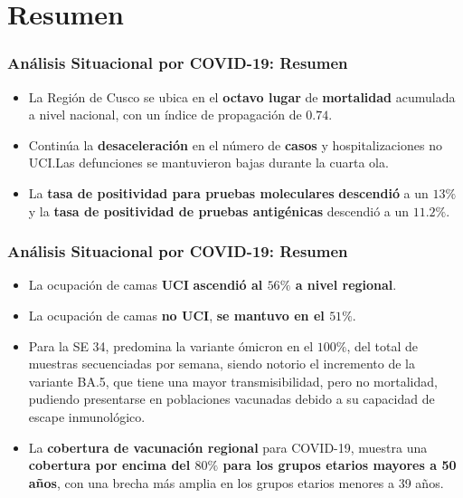 \documentclass[xcolor=table]{beamer}
\begin{document}
\section{Resumen}
\begin{frame}[label=Resumen]
	\frametitle{Análisis Situacional por COVID-19: Resumen}
	\vspace{-.5cm}
	\begin{itemize}
		\item La Región de Cusco se ubica en el \textbf{\color{mycolor4}octavo lugar} de \textbf{\color{mycolor3}mortalidad} acumulada a nivel nacional, con un índice de propagación de $0.74 $.   
		\item Continúa la \textbf{\color{mycolor4} desaceleración} en el número de \textbf{\color{mycolor3}casos} y hospitalizaciones no UCI.Las defunciones se mantuvieron bajas durante la cuarta ola.
		\item La \textbf{\color{mycolor3}tasa de positividad para pruebas moleculares} \textbf{\color{mycolor4}descendió} a un $13\%$ y la \textbf{\color{mycolor3}tasa de positividad de pruebas antigénicas} descendió a un $11.2\%$.
	\end{itemize}
\end{frame}

\begin{frame}
	\frametitle{Análisis Situacional por COVID-19: Resumen}
	\vspace{-.5cm}
	\begin{itemize}
	\item La ocupación de camas \textbf{\color{mycolor3}UCI} \textbf{\color{mycolor3} ascendió al $56\%$ a nivel regional}.
	\item La ocupación de camas \textbf{\color{mycolor3}no UCI}, \textbf{\color{mycolor4}se mantuvo en el $51\%$}. 
	\item Para la SE 34, predomina la variante ómicron en el $100\%$, del total de muestras secuenciadas por semana, siendo notorio el incremento de la variante BA.5, que tiene una mayor transmisibilidad, pero no mortalidad, pudiendo presentarse en poblaciones vacunadas debido a su capacidad de escape inmunológico.
	\item La \textbf{\color{mycolor3}cobertura de vacunación regional} para COVID-19, muestra una \textbf{\color{mycolor4}cobertura por encima del $80\%$ para los grupos etarios mayores a 50 años}, con una brecha más amplia en los grupos etarios menores a 39 años.	
	\end{itemize}
\end{frame}
\end{document}
